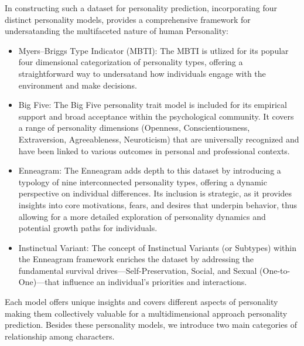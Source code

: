 \documentclass[11pt]{article}
\begin{document}
In constructing such a dataset for personality prediction, incorporating four distinct personality models, provides a comprehensive framework for undersatanding the multifaceted nature of human Personality:
\begin{itemize}
  \item Myers–Briggs Type Indicator (MBTI): The MBTI is utlized for its popular four dimensional categorization of personality types, offering a straightforward way to undersatand how individuals engage with the environment and make decisions.
  \item Big Five: The Big Five personality trait model is included for its empirical support and broad acceptance within the psychological community. It covers a range of personality dimensions (Openness, Conscientiousness, Extraversion, Agreeableness, Neuroticism) that are universally recognized and have been linked to various outcomes in personal and professional contexts.
  \item Enneagram: The Enneagram adds depth to this dataset by introducing a typology of nine interconnected personality types, offering a dynamic perspective on individual differences. Its inclusion is strategic, as it provides insights into core motivations, fears, and desires that underpin behavior, thus allowing for a more detailed exploration of personality dynamics and potential growth paths for individuals.
  \item Instinctual Variant: The concept of Instinctual Variants (or Subtypes) within the Enneagram framework enriches the dataset by addressing the fundamental survival drives—Self-Preservation, Social, and Sexual (One-to-One)—that influence an individual's priorities and interactions.
\end{itemize}

Each model offers unique insights and covers different aspects of personality making them collectively valuable for a multidimensional approach personality prediction. Besides these personality models, we introduce two main categories of relationship among characters.
\end{document}
